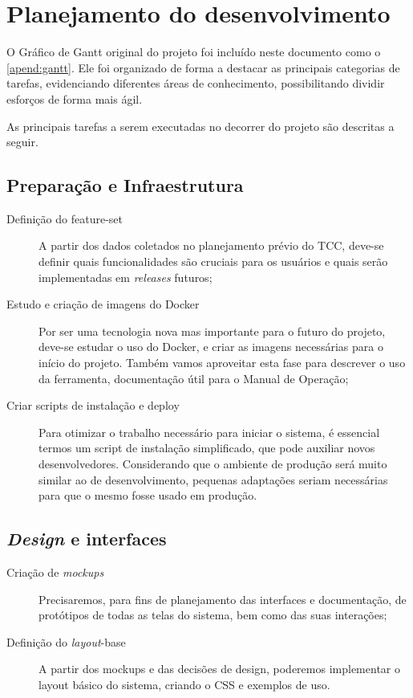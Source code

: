 \documentclass[12pt,a4paper,twoside,hyphens,english,brazil]{abntex2}
\begin{document}
\section{Planejamento do desenvolvimento}

O Gráfico de Gantt original do projeto foi incluído neste documento como o \autoref{apend:gantt}. Ele foi organizado de forma a destacar as principais categorias de tarefas, evidenciando diferentes áreas de conhecimento, possibilitando dividir esforços de forma mais ágil.

As principais tarefas a serem executadas no decorrer do projeto são descritas a seguir.

\subsection{Preparação e Infraestrutura}
	\begin{description}
		\item[Definição do feature-set]
			A partir dos dados coletados no planejamento prévio do TCC, deve-se definir quais funcionalidades são cruciais para os usuários e quais serão implementadas em \emph{releases} futuros;
		\item[Estudo e criação de imagens do Docker]
			Por ser uma tecnologia nova mas importante para o futuro do projeto, deve-se estudar o uso do Docker, e criar as imagens necessárias para o início do projeto. Também vamos aproveitar esta fase para descrever o uso da ferramenta, documentação útil para o Manual de Operação;
		\item[Criar scripts de instalação e deploy]
			Para otimizar o trabalho necessário para iniciar o sistema, é essencial termos um script de instalação simplificado, que pode auxiliar novos desenvolvedores. Considerando que o ambiente de produção será muito similar ao de desenvolvimento, pequenas adaptações seriam necessárias para que o mesmo fosse usado em produção.
	\end{description}
	
\subsection{\emph{Design} e interfaces}
	\begin{description}
		\item[Criação de \emph{mockups}]
			Precisaremos, para fins de planejamento das interfaces e documentação, de protótipos de todas as telas do sistema, bem como das suas interações;
		\item[Definição do \emph{layout}-base]
			A partir dos mockups e das decisões de design, poderemos implementar o layout básico do sistema, criando o CSS e exemplos de uso.
	\end{description}
	
\end{document}
